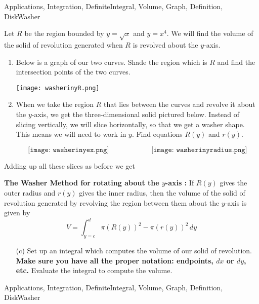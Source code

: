 \begin{tagblock}{Applications, Integration, DefiniteIntegral, Volume, Graph, Definition, DiskWasher}
\begin{question}
	


Let  $R$ be the region bounded by $y=\sqrt{x}$ and $y=x^4$.  We will find the volume of the  solid of revolution generated when $R$ is revolved about the $y$-axis.
\begin{enumerate}
\item Below is a graph of our two curves.  Shade the region which is $R$ and find the intersection points of the two curves.

\texttt{[image: washerinyR.png]}

\item When we take the region $R$ that lies between the curves and revolve it about the $y$-axis, we get the three-dimensional solid pictured below.   Instead of slicing vertically, we will slice horizontally, so that we get a washer shape.  This means we will need to work in $y$.  Find equations $R(y)$ and $r(y)$.  


\[\texttt{[image: washerinyex.png]} \hspace{1in} \texttt{[image: washerinyradius.png]} \]

\end{enumerate}

\bigskip

Adding up all these slices as before we get

\textbf{The Washer Method for rotating about the $y$-axis :}  If $R(y)$ gives the outer radius and $r(y)$ gives the inner radius, then the  volume of the solid of revolution generated by revolving the region between them about the $y$-axis is given by
\[V = \int_{y=c}^d \pi(R(y))^2 - \pi (r(y))^2 \, dy\]
\begin{enumerate}

\item[(c)] Set up an integral which  computes the volume of our  solid of revolution.  \textbf{Make sure you have all the proper notation: endpoints, $dx$ or $dy$, etc.}  Evaluate the integral to compute the volume.  
\end{enumerate}



    
\begin{tags}
       Applications, Integration, DefiniteIntegral, Volume, Graph, Definition, DiskWasher
\end{tags}
    
\begin{diary}
\end{diary}
	
\begin{solution}

\end{solution}
	
\end{question}

\end{tagblock}

